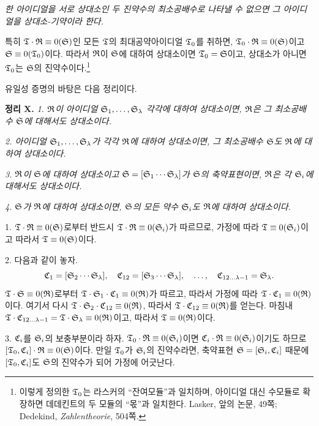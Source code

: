 \emph{한 아이디얼을 서로 상대소인 두 진약수의 최소공배수로 나타낼 수 없으면 그 아이디얼을 상대소-기약이라 한다.}

특히 $\mathfrak{T}\cdot\mathfrak{R}\equiv0(\mathfrak{S})$인 모든 $\mathfrak{T}$의 최대공약아이디얼 $\mathfrak{T}_0$를 취하면, $\mathfrak{T}_0\cdot\mathfrak{R}\equiv0(\mathfrak{S})$이고 $\mathfrak{S}\equiv0(\mathfrak{T}_0)$이다. 따라서 $\mathfrak{R}$이 $\mathfrak{S}$에 대하여 상대소이면 $\mathfrak{T}_0=\mathfrak{S}$이고, 상대소가 아니면 $\mathfrak{T}_0$는 $\mathfrak{S}$의 진약수이다.\footnote{이렇게 정의한 $\mathfrak{T}_0$는 라스커의 ``잔여모듈''과 일치하며, 아이디얼 대신 수모듈로 확장하면 데데킨트의 두 모듈의 ``몫''과 일치한다. Lasker, 앞의 논문, 49쪽; Dedekind, \emph{Zahlentheorie}, 504쪽.}

유일성 증명의 바탕은 다음 정리이다.

\textbf{정리 X.} \emph{1. $\mathfrak{R}$이 아이디얼 $\mathfrak{S}_1,\ldots,\mathfrak{S}_\lambda$ 각각에 대하여 상대소이면, $\mathfrak{R}$은 그 최소공배수 $\mathfrak{S}$에 대해서도 상대소이다.}

\emph{2. 아이디얼 $\mathfrak{S}_1,\ldots,\mathfrak{S}_\lambda$가 각각 $\mathfrak{R}$에 대하여 상대소이면, 그 최소공배수 $\mathfrak{S}$도 $\mathfrak{R}$에 대하여 상대소이다.}

\emph{3. $\mathfrak{R}$이 $\mathfrak{S}$에 대하여 상대소이고 $\mathfrak{S}=[\mathfrak{S}_1\cdots\mathfrak{S}_\lambda]$가 $\mathfrak{S}$의 축약표현이면, $\mathfrak{R}$은 각 $\mathfrak{S}_i$에 대해서도 상대소이다.}

\emph{4. $\mathfrak{S}$가 $\mathfrak{R}$에 대하여 상대소이면, $\mathfrak{S}$의 모든 약수 $\mathfrak{S}_i$도 $\mathfrak{R}$에 대하여 상대소이다.}

1. $\mathfrak{T}\cdot\mathfrak{R}\equiv0(\mathfrak{S})$로부터 반드시 $\mathfrak{T}\cdot\mathfrak{R}\equiv0(\mathfrak{S}_i)$가 따르므로, 가정에 따라 $\mathfrak{T}\equiv0(\mathfrak{S}_i)$이고 따라서 $\mathfrak{T}\equiv0(\mathfrak{S})$이다.

2. 다음과 같이 놓자.
\[
 \mathfrak{C}_1=[\mathfrak{S}_2\cdots\mathfrak{S}_\lambda],\quad
 \mathfrak{C}_{12}=[\mathfrak{S}_3\cdots\mathfrak{S}_\lambda],\quad\ldots,\quad
 \mathfrak{C}_{12\ldots\lambda-1}=\mathfrak{S}_\lambda.
\]
$\mathfrak{T}\cdot\mathfrak{S}\equiv0(\mathfrak{R})$로부터 $\mathfrak{T}\cdot\mathfrak{S}_1\cdot\mathfrak{C}_1\equiv0(\mathfrak{R})$가 따르고, 따라서 가정에 따라 $\mathfrak{T}\cdot\mathfrak{C}_1\equiv0(\mathfrak{R})$이다. 여기서 다시 $\mathfrak{T}\cdot\mathfrak{S}_2\cdot\mathfrak{C}_{12}\equiv0(\mathfrak{R})$, 따라서 $\mathfrak{T}\cdot\mathfrak{C}_{12}\equiv0(\mathfrak{R})$를 얻는다. 마침내 $\mathfrak{T}\cdot\mathfrak{C}_{12\ldots\lambda-1}=\mathfrak{T}\cdot\mathfrak{S}_\lambda\equiv0(\mathfrak{R})$이고, 따라서 $\mathfrak{T}\equiv0(\mathfrak{R})$이다.

3. $\mathfrak{C}_i$를 $\mathfrak{S}_i$의 보충부분이라 하자. $\mathfrak{T}_0\cdot\mathfrak{R}\equiv0(\mathfrak{S}_i)$이면 $\mathfrak{C}_i\cdot\mathfrak{R}\equiv0(\mathfrak{S}_i)$이기도 하므로 $[\mathfrak{T}_0,\mathfrak{C}_i]\cdot\mathfrak{R}\equiv0(\mathfrak{S})$이다. 만일 $\mathfrak{T}_0$가 $\mathfrak{S}_i$의 진약수라면, 축약표현 $\mathfrak{S}=[\mathfrak{S}_i,\mathfrak{C}_i]$ 때문에 $[\mathfrak{T}_0,\mathfrak{C}_i]$도 $\mathfrak{S}$의 진약수가 되어 가정에 어긋난다.

